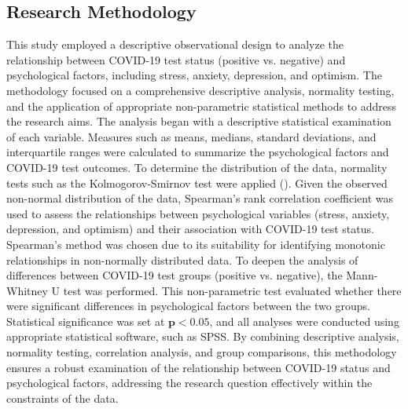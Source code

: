 \documentclass[a4paper]{article}
\begin{document}
\vspace{1em}
\subsection{Research Methodology}
\vspace{0.5em}
This study employed a descriptive observational design to analyze the relationship between COVID-19 test status (positive vs. negative) and psychological factors, including stress, anxiety, depression, and optimism.
\vspace{0.5em}\newline
The methodology focused on a comprehensive descriptive analysis, normality testing, and the application of appropriate non-parametric statistical methods to address the research aims.
The analysis began with a descriptive statistical examination of each variable. Measures such as means, medians, standard deviations, and interquartile ranges were calculated to summarize the
psychological factors and COVID-19 test outcomes. To determine the distribution of the data, normality tests such as the Kolmogorov-Smirnov test were applied (\citet{sheskin2011}).
\vspace{0.5em}\newline
Given the observed non-normal distribution of the data, Spearman’s rank correlation coefficient was used to assess the relationships between psychological variables 
(stress, anxiety, depression, and optimism) and their association with COVID-19 test status. Spearman’s method was chosen due to its suitability
for identifying monotonic relationships in non-normally distributed data.
\vspace{0.5em}\newline
To deepen the analysis of differences between COVID-19 test groups (positive vs. negative), the Mann-Whitney U test was performed. This non-parametric test evaluated whether there were significant
differences in psychological factors between the two groups. Statistical significance was set at 
\(\boldsymbol{p < 0.05 }\), and all analyses were conducted using appropriate statistical software, such as SPSS.
\vspace{0.5em}\newline
By combining descriptive analysis, normality testing, correlation analysis, and group comparisons, this methodology ensures a robust examination of the relationship between COVID-19 status and psychological factors, addressing the research question effectively within the constraints of the data.
\end{document}
